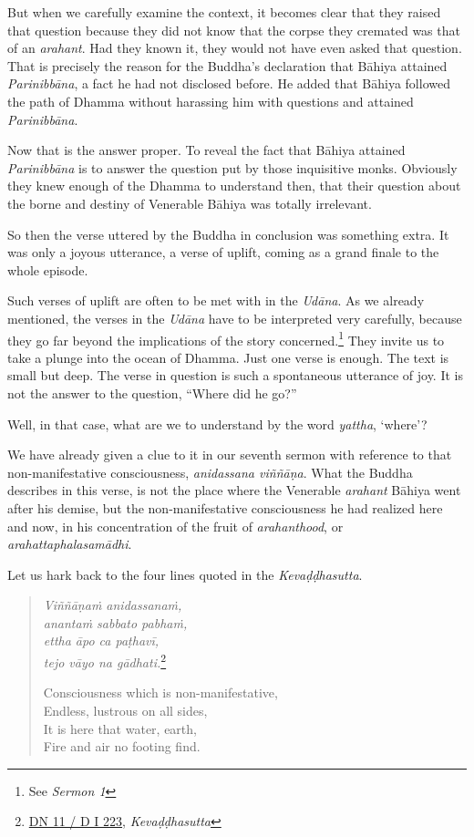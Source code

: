 But when we carefully examine the context, it becomes clear that they raised that question because they did not know that the corpse they cremated was that of an \emph{arahant}. Had they known it, they would not have even asked that question. That is precisely the reason for the Buddha's declaration that Bāhiya attained \emph{Parinibbāna}, a fact he had not disclosed before. He added that Bāhiya followed the path of Dhamma without harassing him with questions and attained \emph{Parinibbāna}.

Now that is the answer proper. To reveal the fact that Bāhiya attained \emph{Parinibbāna} is to answer the question put by those inquisitive monks. Obviously they knew enough of the Dhamma to understand then, that their question about the borne and destiny of Venerable Bāhiya was totally irrelevant.

So then the verse uttered by the Buddha in conclusion was something extra. It was only a joyous utterance, a verse of uplift, coming as a grand finale to the whole episode.

Such verses of uplift are often to be met with in the \emph{Udāna}. As we already mentioned, the verses in the \emph{Udāna} have to be interpreted very carefully, because they go far beyond the implications of the story concerned.\footnote{See \emph{Sermon 1}} They invite us to take a plunge into the ocean of Dhamma. Just one verse is enough. The text is small but deep. The verse in question is such a spontaneous utterance of joy. It is not the answer to the question, ``Where did he go?''

Well, in that case, what are we to understand by the word \emph{yattha}, `where'?

We have already given a clue to it in our seventh sermon with reference to that non-manifestative consciousness, \emph{anidassana viññāṇa}. What the Buddha describes in this verse, is not the place where the Venerable \emph{arahant} Bāhiya went after his demise, but the non-manifestative consciousness he had realized here and now, in his concentration of the fruit of \emph{arahanthood}, or \emph{arahattaphalasamādhi}.

Let us hark back to the four lines quoted in the \emph{Kevaḍḍhasutta}.

\clearpage

\begin{quote}
\emph{Viññāṇaṁ anidassanaṁ,}\\
\emph{anantaṁ sabbato pabhaṁ,}\\
\emph{ettha āpo ca paṭhavī,}\\
\emph{tejo vāyo na gādhati.}\footnote{\href{https://suttacentral.net/dn11/pli/ms}{DN 11 / D I 223}, \emph{Kevaḍḍhasutta}}

Consciousness which is non-manifestative,\\
Endless, lustrous on all sides,\\
It is here that water, earth,\\
Fire and air no footing find.
\end{quote}

